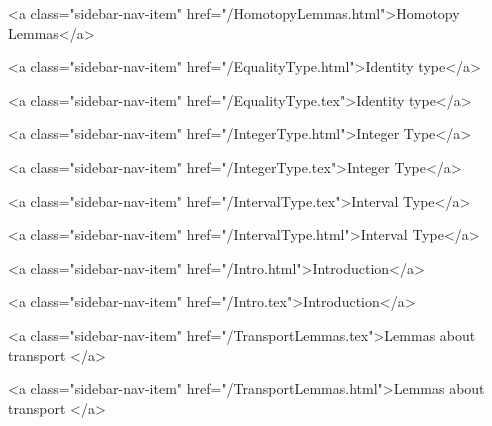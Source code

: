       
        
          <a class="sidebar-nav-item" href="/HomotopyLemmas.html">Homotopy Lemmas</a>
        
      
    
      
        
          <a class="sidebar-nav-item" href="/EqualityType.html">Identity type</a>
        
      
    
      
        
          <a class="sidebar-nav-item" href="/EqualityType.tex">Identity type</a>
        
      
    
      
        
          <a class="sidebar-nav-item" href="/IntegerType.html">Integer Type</a>
        
      
    
      
        
          <a class="sidebar-nav-item" href="/IntegerType.tex">Integer Type</a>
        
      
    
      
        
          <a class="sidebar-nav-item" href="/IntervalType.tex">Interval Type</a>
        
      
    
      
        
          <a class="sidebar-nav-item" href="/IntervalType.html">Interval Type</a>
        
      
    
      
        
          <a class="sidebar-nav-item" href="/Intro.html">Introduction</a>
        
      
    
      
        
          <a class="sidebar-nav-item" href="/Intro.tex">Introduction</a>
        
      
    
      
        
          <a class="sidebar-nav-item" href="/TransportLemmas.tex">Lemmas about transport </a>
        
      
    
      
        
          <a class="sidebar-nav-item" href="/TransportLemmas.html">Lemmas about transport </a>
        
      
    
